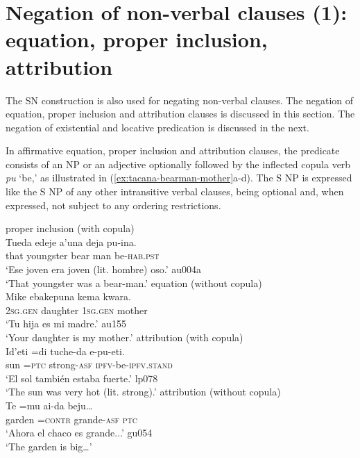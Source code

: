 \documentclass[output=paper]{langsci/langscibook}
\begin{document}
\section{Negation of non-verbal clauses (1): equation, proper inclusion, attribution}
\label{sec:tacana-4}

The SN construction is also used for negating non-verbal clauses. The
negation of equation, proper inclusion and attribution clauses is discussed
in this section. The negation of existential and locative predication is discussed in the next.

In affirmative equation, proper inclusion and attribution clauses, the
predicate consists of an NP or an adjective optionally followed by
the inflected copula verb \textit{pu} `be,' as illustrated in
(\ref{ex:tacana-bearman-mother}a-d). The S NP is expressed like the S NP of any other intransitive verbal clauses, being optional and, when expressed, not subject to any ordering restrictions.
%
\begin{exe}\ex\label{ex:tacana-bearman-mother}
\begin{xlist}
\ex\label{ex:tacana-bearman} 
proper inclusion (with copula)\\
\gll 
    Tueda edeje{\cb}
    a'una deja{\cb}  
    pu-ina.\\
    that  youngster  bear  man  be-\textsc{hab.pst}\\
\glt`Ese joven era joven (lit. hombre) oso.' au004a\\
`That youngster was a bear-man.'
\ex\label{ex:tacana-mother} 
  equation (without copula)\\
\gll {}Mike ebakepuna{\cb}
kema kwara{\cb}.\\
  \textsc{2sg.gen}  daughter  \textsc{1sg.gen}  mother\\
\glt `Tu hija es mi madre.' au155\\
`Your daughter is my mother.'
\ex\label{ex:tacana-veryhot}
  attribution (with copula)\\
\gll
    Id'eti  =di
    tuche-da
    e-pu-eti.\\
    sun  =\textsc{ptc}  strong-\textsc{asf}
    \textsc{ipfv}-be-\textsc{ipfv.stand}\\
\glt `El sol también estaba fuerte.' lp078\\
`The sun was very hot (lit. strong).' 
\ex\label{ex:tacana-garden}
  attribution (without copula)\\
\gll {}Te  =mu
ai-da  beju…\\
    garden  =\textsc{contr}  grande-\textsc{asf}  \textsc{ptc}\\
\glt `Ahora el chaco es grande...' gu054\\
`The garden is big…' 
\end{xlist}\end{exe}
\end{document}

